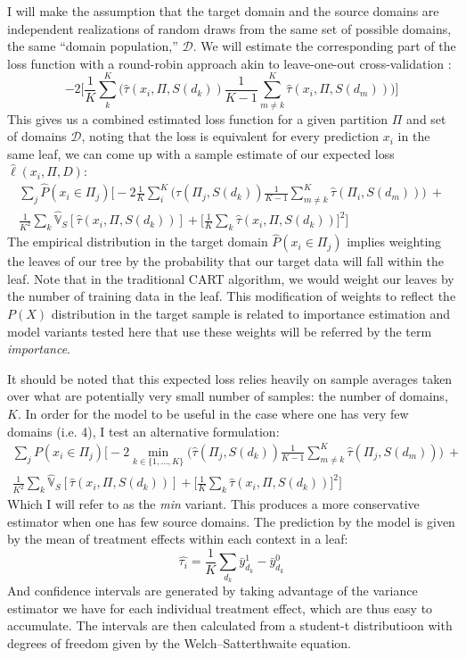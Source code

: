 \documentclass[a4paper,12pt]{article}
\theoremstyle{proposition}
\newcommand{\TTsi}{\hat{\tau}(x_i, \Pi, S(d_k))}
\newcommand{\Var}{\mathbb{V}}
\begin{document}
I will make the assumption that the target domain and the source domains are independent realizations of random draws from the same set of possible domains, the same ``domain population,'' $\mathcal{D}$. We will estimate the corresponding part of the loss function with a round-robin approach akin to leave-one-out cross-validation \parencite[See][for an overview of cross-validation]{Hastie2009}:
%
$$
-2 \bigg[ \frac{1}{K} \sum_k^K  \bigg( \hat{\tau}(x_i, \Pi, S(d_k)) \frac{1}{K - 1} \sum_{m \neq k}^K \hat{\tau}(x_i, \Pi, S(d_m)) \bigg) \bigg]
$$
%
This gives us a combined estimated loss function for a given partition $\Pi$ and set of domains $\mathcal{D}$, noting that the loss is equivalent for every prediction $x_i$ in the same leaf, we can come up with a sample estimate of our expected loss $\hat{\ell}(x_i, \Pi, D)$:
%
\begin{multline*}
\sum_{j} \hat{P}(x_i \in \Pi_j) \bigg[ -2   \frac{1}{K} \sum_i^K  \bigg( \hat{\tau}(\Pi_j, S(d_k)) \frac{1}{K - 1} \sum_{m \neq k}^K \hat{\tau}(\Pi_i, S(d_m)) \bigg) \ + \\ \frac{1}{K^2} \sum_k \hat{\Var}_{S} [\TTsi] + \bigg[ \frac{1}{K} \sum_k \TTsi \bigg]^2 \bigg]
\end{multline*}
%
The empirical distribution in the target domain $\hat{P}(x_i \in \Pi_j)$ implies weighting the leaves of our tree by the probability that our target data will fall within the leaf. Note that in the traditional CART algorithm, we would weight our leaves by the number of training data in the leaf. This modification of weights to reflect the $P(X)$ distribution in the target sample is related to importance estimation \parencite{Shimodaira2000} and model variants tested here that use these weights will be referred by the term \textit{importance}.

It should be noted that this expected loss relies heavily on sample averages taken over what are potentially very small number of samples: the number of domains, $K$. In order for the model to be useful in the case where one has very few domains (i.e. 4), I test an alternative formulation:
%
\begin{multline*}
\sum_{j} P(x_i \in \Pi_j) \bigg[ -2   \min_{k \in \{1,\dots,K \}}  \bigg( \hat{\tau}(\Pi_j, S(d_k)) \frac{1}{K - 1} \sum_{m \neq k}^K \hat{\tau}(\Pi_j, S(d_m)) \bigg) \ + \\ \frac{1}{K^2} \sum_k \hat{\Var}_{S} [\TTsi] + \bigg[ \frac{1}{K} \sum_k \TTsi \bigg]^2 \bigg]
\end{multline*}
%
Which I will refer to as the \textit{min} variant. This produces a more conservative estimator when one has few source domains.
%
The prediction by the model is given by the mean of treatment effects within each context in a leaf:
$$
\hat{\tau_i} = \frac{1}{K} \sum_{d_k} \bar{y}^1_{d_k} - \bar{y}^0_{d_k}
$$
And confidence intervals are generated by taking advantage of the variance estimator we have for each individual treatment effect, which are thus easy to accumulate. The intervals are then calculated from a student-t distributioon with degrees of freedom given by the Welch–Satterthwaite equation.
\end{document}
